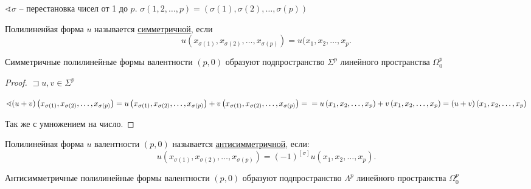 \documentclass{book}
\theoremstyle{definition}
\begin{document}
    $\sphericalangle \sigma$ -- перестановка чисел от 1 до $p$.  $\sigma\left( 1, 2, \ldots, p \right)  = \left( \sigma(1), \sigma(2), \ldots, \sigma(p) \right) $

    \begin{definition}
    Полилиненйая форма $u$ называется \underline{симметричной}, если \[
            u\left( x_{\sigma(1)}, x_{\sigma(2)}, \ldots, x_{\sigma(p)} \right) = u(x_1, x_2, \ldots, x_p 
        .\]  
    \end{definition}

    \begin{lemma}
        Симметричные полилинейные формы валентности $(p,0)$ образуют подпространство $\Sigma^p$ линейного пространства $\Omega_0^p$
    \end{lemma}
    \begin{proof}
        $ \sqsupset u, v\in \Sigma^p$

        $\sphericalangle (u+v)\left( x_{\sigma(1)}, x_{\sigma(2)}, \ldots, x_{\sigma(p)} \right) = u\left( x_{\sigma(1)}, x_{\sigma(2)}, \ldots, x_{\sigma(p)} \right)  + v\left( x_{\sigma(1)}, x_{\sigma(2)}, \ldots, x_{\sigma(p)} \right) =\\=u\left( x_1, x_2, \ldots, x_p \right) + v\left( x_1, x_2, \ldots, x_p \right)  = (u+v)\left( x_1, x_2, \ldots, x_p \right)  $

        Так же с умножением на число.
    \end{proof}

    \begin{definition}
        Полилинейная форма $u$ валентности $(p,0)$ называется \underline{антисимметричной}, если:
        \[
            u\left( x_{\sigma(1)}, x_{\sigma(2)}, \ldots, x_{\sigma(p)} \right) = (-1)^{[\sigma]}u(x_1, x_2, \ldots, x_p) 
        .\]
    \end{definition}
    \begin{lemma}
        Антисимметричные полилинейные формы валентности $(p,0)$ образуют подпространство $\Lambda^p$ линейного пространства  $\Omega_0^p$
    \end{lemma}
\end{document}
